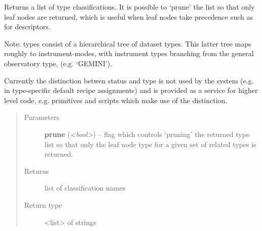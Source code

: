 \documentclass[letterpaper,10pt,english]{sphinxmanual}
\begin{document}
\begin{fulllineitems}
\begin{fulllineitems}
\end{fulllineitems}


\begin{fulllineitems}
\label{astro_class:astrodata.AstroData.AstroData.type}
Returns a list of type classifications. It is possible to `prune' 
the list so that only leaf nodes are returned, which is 
useful when leaf nodes take precedence such as for descriptors.

Note: types consist of a hierarchical tree of dataset types.
This latter tree maps roughly to instrument-modes, with instrument 
types branching from the general observatory type, (e.g. `GEMINI').

Currently the distinction betwen status and type is not used by the
system (e.g. in type-specific default recipe assignments) and is
provided as a service for higher level code, e.g. primitives and
scripts which make use of the distinction.
\begin{quote}\begin{description}
\item[{Parameters}] \leavevmode
\textbf{prune} (\emph{\textless{}bool\textgreater{}}) -- flag which controls `pruning' the returned type list 
so that only the leaf node type for a given set of 
related types is returned.

\item[{Returns}] \leavevmode
list of classification names

\item[{Return type}] \leavevmode
\textless{}list\textgreater{} of strings

\end{description}\end{quote}

\end{fulllineitems}



\end{fulllineitems}
\end{document}
